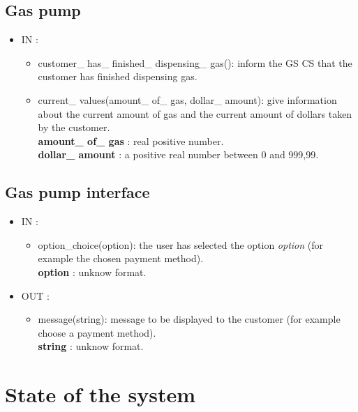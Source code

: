 \documentclass[11pt,a4paper]{article}
\begin{document}
\subsection{Gas pump}
\begin{itemize}
\item IN : 
	\begin{itemize}
		\item  customer\_ has\_ finished\_ dispensing\_ gas(): inform the GS CS that the customer has finished dispensing gas.
		\item  current\_ values(amount\_ of\_ gas, dollar\_ amount): give information about the current amount of gas and the current amount of dollars taken by the customer. \\
		\textbf{amount\_ of\_ gas} : real positive number. \\
		\textbf{dollar\_ amount} : a positive real number between 0 and 999,99.
	\end{itemize}
\end{itemize}

\subsection{Gas pump interface }
\begin{itemize}
\item IN : 
	\begin{itemize}
		\item  option\_choice(option): the user has selected the option \textit{option} (for example the chosen payment method). \\
		\textbf{option} : unknow format.
	\end{itemize}
\item OUT : 
	\begin{itemize}
		\item  message(string): message to be displayed to the customer (for example choose a payment method). \\
		\textbf{string} : unknow format.
	\end{itemize}
\end{itemize}




\section{State of the system}
\end{document}
